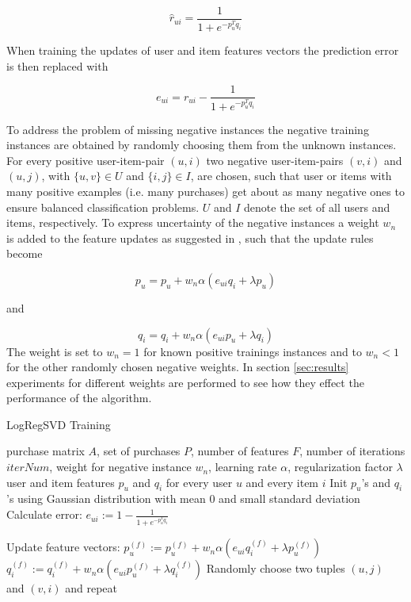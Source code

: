 \documentclass[10pt]{reportMaster}
\begin{document}
\begin{equation}
	\hat{r}_{ui} = \frac{1}{1 + e^{-p_u^Tq_i}}
\end{equation}

When training the updates of user and item features vectors the prediction error is then replaced with 

\begin{equation}
	e_{ui} = r_{ui} - \frac{1}{1 + e^{-p_u^Tq_i}}
\end{equation}

To address the problem of missing negative instances the negative training instances are obtained by randomly choosing them from the unknown instances.
For every positive user-item-pair $(u, i)$ two negative user-item-pairs $(v, i)$ and $(u,j)$, with $\{u, v\} \in U$ and $\{i, j\} \in I$, are chosen, such that user or items with many positive examples (i.e. many purchases) get about as many negative ones to ensure balanced classification problems.
$U$ and $I$ denote the set of all users and items, respectively.
To express uncertainty of the negative instances a weight $w_n$ is added to the feature updates as suggested in \cite{occf}, such that the update rules become 

\begin{equation}
	p_u = p_u + w_n \alpha (e_{ui} q_i + \lambda p_u)
\end{equation}

and 

\begin{equation}
	q_i = q_i + w_n \alpha (e_{ui} p_u + \lambda q_i)
\end{equation}
The weight is set to $w_n = 1$ for known positive trainings instances and to $w_n < 1$ for the other randomly chosen negative weights.
In section \ref{sec:results} experiments for different weights are performed to see how they effect the performance of the algorithm.

\begin{algorithm}
	\caption{LogRegSVD Training}
	\label{alg:LogRegSVDTraining}
	\begin{algorithmic}[1]
		\Require purchase matrix $A$, set of purchases $P$, number of features $F$, number of iterations $iterNum$, weight for negative instance $w_n$, learning rate $\alpha$, regularization factor $\lambda$
		\Ensure user and item features $p_u$ and $q_i$ for every user $u$ and every item $i$
		\State Init $p_u$'s and $q_i$'s using Gaussian distribution with mean $0$ and small standard deviation
				\State Calculate error:
				\State $e_{ui} := 1 - \frac{1}{1 + e^{-p_u^Tq_i}}$
				
				\State Update feature vectors:
					\State $p_u^{(f)} := p_u^{(f)} + w_n \alpha (e_{ui} q_i^{(f)} + \lambda p_u^{(f)})$
					\State $q_i^{(f)} := q_i^{(f)} + w_n \alpha (e_{ui} p_u^{(f)} + \lambda q_i^{(f)})$
				\EndFor	
				\State Randomly choose two tuples $(u,j)$ and $(v,i)$ and repeat
			\EndFor
		\EndFor
	\end{algorithmic}	
\end{algorithm}
\end{document}
